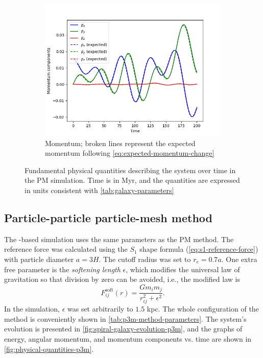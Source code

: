 \begin{figure}[!ht]
    \vspace{0.2cm}

    \begin{subfigure}[b]{0.45\textwidth}
        \centering
        \includegraphics[width=\textwidth]{chapters/results/img/pm-galaxy/momentum.png}
        \caption{Momentum; broken lines represent the expected momentum following \autoref{eq:expected-momentum-change}}
        \label{fig:physical-quantities-pm-sub3}
    \end{subfigure}

    \caption{Fundamental physical quantities describing the system over time in the PM simulation.
        Time is in Myr, and the quantities are expressed in units consistent with \autoref{tab:galaxy-parameters}}
    \label{fig:physical-quantities-pm}
\end{figure}

\subsection{Particle-particle particle-mesh method}
The \PThreeM{}-based simulation uses the same parameters as the PM method.
The reference force was calculated using the $S_1$ shape formula (\autoref{eq:s1-reference-force}) with particle diameter $a=3H$.
The cutoff radius was set to $r_e=0.7a$.
One extra free parameter is the \textit{softening length} $\epsilon$, which modifies the universal law of gravitation so that division by zero can be avoided, i.e., the modified law is
\begin{equation*}
    F^\text{soft}_{ij}(r) = \frac{G m_i m_j}{r_{ij}^2 + \epsilon^2}.
\end{equation*}
In the simulation, $\epsilon$ was set arbitrarily to $1.5$ kpc.
The whole configuration of the \PThreeM{} method is conveniently shown in \autoref{tab:p3m-method-parameters}.
The system's evolution is presented in \autoref{fig:spiral-galaxy-evolution-p3m}, and the graphs of energy, angular momentum, and momentum components vs. time are shown in \autoref{fig:physical-quantities-p3m}.


